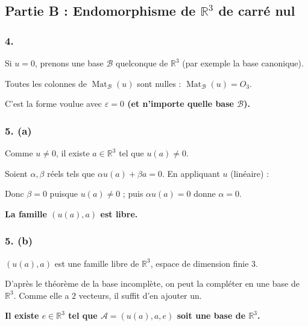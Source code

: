 \documentclass[11pt,a4paper]{article}
\newcommand{\equationajustee}[1]{%
  \sbox{\boiteequation}{$\displaystyle #1$}%
  \ifdim\wd\boiteequation>\linewidth
    \[\resizebox{\linewidth}{!}{\usebox{\boiteequation}}\]%
  \else
    \[#1\]%
  \fi}
\begin{document}
\hypertarget{partie-b-endomorphisme-de-mathbb-r3-de-carruxe9-nul}{%
\subsection{\texorpdfstring{Partie B : Endomorphisme de \(\mathbb R^3\) de carré nul}{Partie B : Endomorphisme de \textbackslash mathbb R\^{}3 de carré nul}}\label{partie-b-endomorphisme-de-mathbb-r3-de-carruxe9-nul}}

\hypertarget{section-2}{%
\subsubsection{4.}\label{section-2}}

Si \(u=0\), prenons une base \(\mathcal B\) quelconque de \(\mathbb R^3\) (par exemple la base canonique).

Toutes les colonnes de \(\operatorname{Mat}_{\mathcal B}(u)\) sont nulles : \(\operatorname{Mat}_{\mathcal B}(u)=O_3\).

C'est la forme voulue avec \textbf{\(\varepsilon=0\) (et n'importe quelle base \(\mathcal B\)).}

\hypertarget{a-11}{%
\subsubsection{5. (a)}\label{a-11}}

Comme \(u\neq0\), il existe \(a\in\mathbb R^3\) tel que \(u(a)\neq0\).

Soient \(\alpha,\beta\) réels tels que \(\alpha u(a)+\beta a=0\). En appliquant \(u\) (linéaire) :

\equationajustee{\alpha u^2(a)+\beta u(a)=\beta u(a)=0.}

Donc \(\beta=0\) puisque \(u(a)\neq0\) ; puis \(\alpha u(a)=0\) donne \(\alpha=0\).

\textbf{La famille \((u(a),a)\) est libre.}

\hypertarget{b-11}{%
\subsubsection{5. (b)}\label{b-11}}

\((u(a),a)\) est une famille libre de \(\mathbb R^3\), espace de dimension finie \(3\).

D'après le théorème de la base incomplète, on peut la compléter en une base de \(\mathbb R^3\). Comme elle a \(2\) vecteurs, il suffit d'en ajouter un.

\textbf{Il existe \(e\in\mathbb R^3\) tel que \(\mathcal A=(u(a),a,e)\) soit une base de \(\mathbb R^3\).}
\end{document}
